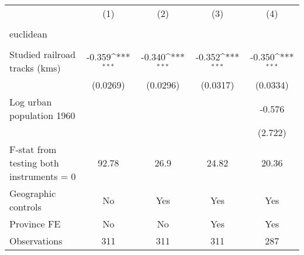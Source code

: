 {
\def\sym#1{\ifmmode^{#1}\else\(^{#1}\)\fi}
\begin{tabular}{l*{4}{c}}
\hline\hline
                &\multicolumn{1}{c}{(1)}&\multicolumn{1}{c}{(2)}&\multicolumn{1}{c}{(3)}&\multicolumn{1}{c}{(4)}\\
                &\multicolumn{1}{c}{}&\multicolumn{1}{c}{}&\multicolumn{1}{c}{}&\multicolumn{1}{c}{}\\
\hline
euclidean       &                  &                  &                  &                  \\
                &                  &                  &                  &                  \\
[1em]
Studied railroad tracks (kms)&   -0.359\sym{***}&   -0.340\sym{***}&   -0.352\sym{***}&   -0.350\sym{***}\\
                & (0.0269)         & (0.0296)         & (0.0317)         & (0.0334)         \\
[1em]
Log urban population 1960&                  &                  &                  &   -0.576         \\
                &                  &                  &                  &  (2.722)         \\
\hline
F-stat from testing both instruments = 0&    92.78         &     26.9         &    24.82         &    20.36         \\
Geographic controls&       No         &      Yes         &      Yes         &      Yes         \\
Province FE     &       No         &       No         &      Yes         &      Yes         \\
Observations    &      311         &      311         &      311         &      287         \\
\hline\hline
\end{tabular}
}
